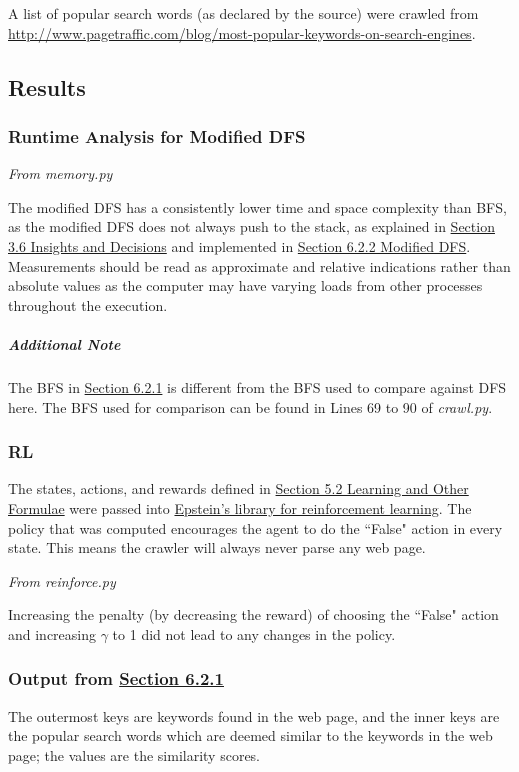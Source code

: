 \documentclass{article}
\begin{document}
A list of popular search words (as declared by the source) were crawled from \url{http://www.pagetraffic.com/blog/most-popular-keywords-on-search-engines}.
\newpage

\subsection{Results}

\subsubsection{Runtime Analysis for Modified DFS}
\label{sec:7.3.1}
\textit{From memory.py}


The modified DFS has a consistently lower time and space complexity than BFS, as the modified DFS does not always push to the stack, as explained in \hyperref[sec:3.6]{Section 3.6 Insights and Decisions} and implemented in \hyperref[sec:6.2.2]{Section 6.2.2 Modified DFS}. Measurements should be read as approximate and relative indications rather than absolute values as the computer may have varying loads from other processes throughout the execution.

\subparagraph{Additional Note} The BFS in \hyperref[sec:6.2.1]{Section 6.2.1} is different from the BFS used to compare against DFS here. The BFS used for comparison can be found in Lines 69 to 90 of \textit{crawl.py}.
\newpage

\subsubsection{RL}
\label{sec:7.3.2}
The states, actions, and rewards defined in \hyperref[sec:5.2]{Section 5.2 Learning and Other Formulae} were passed into \href{https://github.com/NathanEpstein/reinforce}{Epstein's library for reinforcement learning}. The policy that was computed encourages the agent to do the ``False" action in every state. This means the crawler will always never parse any web page.
\medskip

\textit{From reinforce.py}


Increasing the penalty (by decreasing the reward) of choosing the ``False" action and increasing $ \gamma $ to 1 did not lead to any changes in the policy.
\newpage

\subsubsection{Output from \hyperref[sec:6.2.1]{Section 6.2.1}}
\label{sec:7.3.3}
The outermost keys are keywords found in the web page, and the inner keys are the popular search words which are deemed similar to the keywords in the web page; the values are the similarity scores.
\medskip
\end{document}
